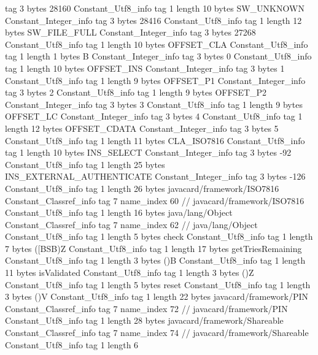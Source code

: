 {{{			tag	3
			bytes	28160
		}
		Constant_Utf8_info {
			tag	1
			length	10
			bytes	SW_UNKNOWN
		}
		Constant_Integer_info {
			tag	3
			bytes	28416
		}
		Constant_Utf8_info {
			tag	1
			length	12
			bytes	SW_FILE_FULL
		}
		Constant_Integer_info {
			tag	3
			bytes	27268
		}
		Constant_Utf8_info {
			tag	1
			length	10
			bytes	OFFSET_CLA
		}
		Constant_Utf8_info {
			tag	1
			length	1
			bytes	B
		}
		Constant_Integer_info {
			tag	3
			bytes	0
		}
		Constant_Utf8_info {
			tag	1
			length	10
			bytes	OFFSET_INS
		}
		Constant_Integer_info {
			tag	3
			bytes	1
		}
		Constant_Utf8_info {
			tag	1
			length	9
			bytes	OFFSET_P1
		}
		Constant_Integer_info {
			tag	3
			bytes	2
		}
		Constant_Utf8_info {
			tag	1
			length	9
			bytes	OFFSET_P2
		}
		Constant_Integer_info {
			tag	3
			bytes	3
		}
		Constant_Utf8_info {
			tag	1
			length	9
			bytes	OFFSET_LC
		}
		Constant_Integer_info {
			tag	3
			bytes	4
		}
		Constant_Utf8_info {
			tag	1
			length	12
			bytes	OFFSET_CDATA
		}
		Constant_Integer_info {
			tag	3
			bytes	5
		}
		Constant_Utf8_info {
			tag	1
			length	11
			bytes	CLA_ISO7816
		}
		Constant_Utf8_info {
			tag	1
			length	10
			bytes	INS_SELECT
		}
		Constant_Integer_info {
			tag	3
			bytes	-92
		}
		Constant_Utf8_info {
			tag	1
			length	25
			bytes	INS_EXTERNAL_AUTHENTICATE
		}
		Constant_Integer_info {
			tag	3
			bytes	-126
		}
		Constant_Utf8_info {
			tag	1
			length	26
			bytes	javacard/framework/ISO7816
		}
		Constant_Classref_info {
			tag	7
			name_index	60		// javacard/framework/ISO7816
		}
		Constant_Utf8_info {
			tag	1
			length	16
			bytes	java/lang/Object
		}
		Constant_Classref_info {
			tag	7
			name_index	62		// java/lang/Object
		}
		Constant_Utf8_info {
			tag	1
			length	5
			bytes	check
		}
		Constant_Utf8_info {
			tag	1
			length	7
			bytes	([BSB)Z
		}
		Constant_Utf8_info {
			tag	1
			length	17
			bytes	getTriesRemaining
		}
		Constant_Utf8_info {
			tag	1
			length	3
			bytes	()B
		}
		Constant_Utf8_info {
			tag	1
			length	11
			bytes	isValidated
		}
		Constant_Utf8_info {
			tag	1
			length	3
			bytes	()Z
		}
		Constant_Utf8_info {
			tag	1
			length	5
			bytes	reset
		}
		Constant_Utf8_info {
			tag	1
			length	3
			bytes	()V
		}
		Constant_Utf8_info {
			tag	1
			length	22
			bytes	javacard/framework/PIN
		}
		Constant_Classref_info {
			tag	7
			name_index	72		// javacard/framework/PIN
		}
		Constant_Utf8_info {
			tag	1
			length	28
			bytes	javacard/framework/Shareable
		}
		Constant_Classref_info {
			tag	7
			name_index	74		// javacard/framework/Shareable
		}
		Constant_Utf8_info {
			tag	1
			length	6
}}}
